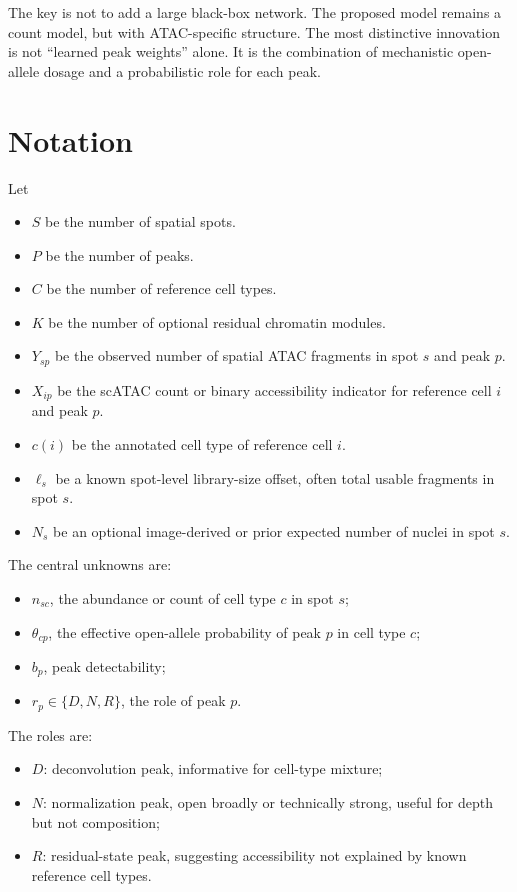 \documentclass[11pt]{article}
\begin{document}
The key is not to add a large black-box network. The proposed model remains a count model, but with ATAC-specific structure. The most distinctive innovation is not ``learned peak weights'' alone. It is the combination of mechanistic open-allele dosage and a probabilistic role for each peak.

\section{Notation}

Let
\begin{itemize}
    \item $S$ be the number of spatial spots.
    \item $P$ be the number of peaks.
    \item $C$ be the number of reference cell types.
    \item $K$ be the number of optional residual chromatin modules.
    \item $Y_{sp}$ be the observed number of spatial ATAC fragments in spot $s$ and peak $p$.
    \item $X_{ip}$ be the scATAC count or binary accessibility indicator for reference cell $i$ and peak $p$.
    \item $c(i)$ be the annotated cell type of reference cell $i$.
    \item $\ell_s$ be a known spot-level library-size offset, often total usable fragments in spot $s$.
    \item $N_s$ be an optional image-derived or prior expected number of nuclei in spot $s$.
\end{itemize}

The central unknowns are:
\begin{itemize}
    \item $n_{sc}$, the abundance or count of cell type $c$ in spot $s$;
    \item $\theta_{cp}$, the effective open-allele probability of peak $p$ in cell type $c$;
    \item $b_p$, peak detectability;
    \item $r_p \in \{D,N,R\}$, the role of peak $p$.
\end{itemize}

The roles are:
\begin{itemize}
    \item $D$: deconvolution peak, informative for cell-type mixture;
    \item $N$: normalization peak, open broadly or technically strong, useful for depth but not composition;
    \item $R$: residual-state peak, suggesting accessibility not explained by known reference cell types.
\end{itemize}
\end{document}
